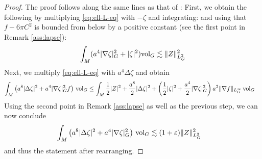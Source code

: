 \documentclass[11pt,leqno,textwidth=10cm]{amsart}
\numberwithin{equation}{section}
\theoremstyle{definition}
\theoremstyle{plain}
\newcommand{\1}{\mathbbm{1}}
\newcommand{\vol}[1]{{\text{\normalfont{vol}}}_{#1}}
\renewcommand{\epsilon}{\varepsilon}
\newcommand{\Lap}{\Delta}
\newcommand{\change}[1]{\color{black}#1\color{black}}
\begin{document}
\begin{proof} The proof follows along the same lines as that of \cite[Lemma 16.5]{Speck2018}: First, we obtain the following by \change{multiplying \eqref{eq:ell-L-eq} with $-\zeta$ and integrating}:
 and using that $f-6\pi C^2$ is bounded from below by a positive constant (see the first point in Remark \ref{ass:lapse}):%
\[\int_M (a^4\lvert\nabla \zeta\rvert_G^2+\lvert\zeta\rvert^2)\vol{G}\lesssim \|Z\|^2_{L^2_G}%
\]
Next, we \change{multiply }\eqref{eq:ell-L-eq} with $a^4\Lap \zeta$ and obtain%
\begin{align*}
\int_{M}\left(a^8\lvert\Lap \zeta\rvert^2+a^4\lvert\nabla \zeta\rvert_G^2f\right)\,\vol{G}%
&\leq\int_M\frac12\lvert Z\rvert^2+\frac{a^8}2\lvert\Lap \zeta\rvert^2+\left(\frac12\lvert\zeta\rvert^2+\frac{a^4}2\lvert\nabla \zeta\rvert_G^2\right)a^2\|\nabla f\|_{L^\infty_G}\,\vol{G}
\end{align*}
Using the second point in Remark \ref{ass:lapse} as well as the previous step, we can now conclude
\begin{align*}
\int_{M} \left(a^8\lvert\Lap \zeta\rvert^2+a^4\lvert\nabla \zeta\rvert_G^2\right)\,\vol{G}%
&\lesssim (1+\epsilon)\|Z\|_{L^2_G}^2
\end{align*}
and thus the statement after rearranging.
\end{proof}
\end{document}

